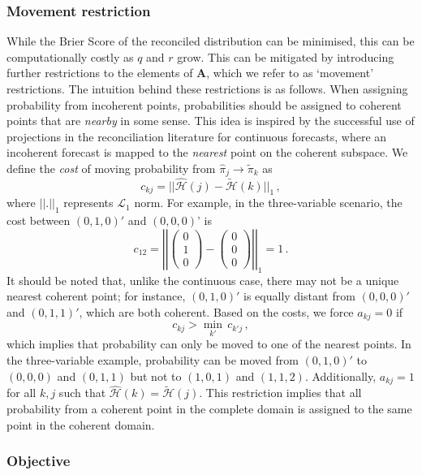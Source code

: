 \documentclass[a4paper,review,11pt,authoryear]{elsarticle}
\theoremstyle{definition}
\begin{document}
    \subsubsection*{\textbf{Movement restriction}}
    While the Brier Score of the reconciled distribution can be minimised, this can be computationally costly as $q$ and $r$ grow. This can be mitigated by introducing further restrictions to the elements of $\mathbf{A}$, which we refer to as `movement' restrictions.  The intuition behind these restrictions is as follows. When assigning probability from incoherent points, probabilities should be assigned to coherent points that are \emph{nearby} in some sense. This idea is inspired by the successful use of projections in the reconciliation literature for continuous forecasts, where an incoherent forecast is mapped to the \emph{nearest} point on the coherent subspace. We define the \emph{cost} of moving probability from $\hat{\pi}_j\rightarrow\tilde{\pi}_k$ as
    \[
    c_{kj}=||\hat{\mathcal{H}}(j)-\tilde{\mathcal{H}}(k)||_1\,,
    \]
    where $||.||_1$ represents $\mathcal{L}_1$ norm. For example, in the three-variable scenario, the cost between $(0, 1, 0)'$ and $(0, 0, 0)$' is
    \[
    c_{12}=\left|\left|\begin{pmatrix}0\\1\\0\end{pmatrix}-\begin{pmatrix}0\\0\\0\end{pmatrix}\right|\right|_1=1\,.
    \]
    It should be noted that, unlike the continuous case, there may not be a unique nearest coherent point; for instance, $(0,1,0)'$ is equally distant from $(0,0,0)'$ and $(0,1,1)'$, which are both coherent.
    Based on the costs, we force $a_{kj}=0$ if
    \[
      c_{kj}>\underset{k'}{\min}\,c_{k'j}\,,
    \]
    which implies that probability can only be moved to one of the nearest points. In the three-variable example, probability can be moved from $(0,1,0)'$ to $(0,0,0)$ and $(0,1,1)$ but not to $(1,0,1)$ and $(1,1,2)$.
    Additionally, $a_{kj}=1$ for all $k,j$ such that $\hat{\mathcal{H}}(k)=\tilde{\mathcal{H}}(j)$.
    This restriction implies that all probability from a coherent point in the complete domain is assigned to the same point in the coherent domain.



    \subsubsection*{\textbf{Objective}}
\end{document}
